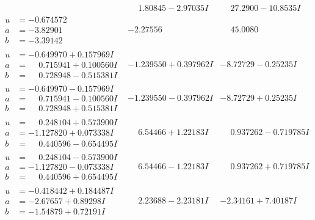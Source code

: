\documentclass[1p]{elsarticle_modified}
\theoremstyle{definition}
\begin{document}
$$\begin{array}{c|c|c}
 & \phantom{-}1.80845 - 2.97035 I & \phantom{-}27.2900 - 10.8535 I \\ \hline\begin{aligned}
u &= -0.674572\phantom{ +0.000000I} \\
a &= -3.82901\phantom{ +0.000000I} \\
b &= -3.39142\phantom{ +0.000000I}\end{aligned}
 & -2.27556\phantom{ +0.000000I} & \phantom{-}45.0080\phantom{ +0.000000I} \\ \hline\begin{aligned}
u &= -0.649970 + 0.157969 I \\
a &= \phantom{-}0.715941 + 0.100560 I \\
b &= \phantom{-}0.728948 - 0.515381 I\end{aligned}
 & -1.239550 + 0.397962 I & -8.72729 - 0.25235 I \\ \hline\begin{aligned}
u &= -0.649970 - 0.157969 I \\
a &= \phantom{-}0.715941 - 0.100560 I \\
b &= \phantom{-}0.728948 + 0.515381 I\end{aligned}
 & -1.239550 - 0.397962 I & -8.72729 + 0.25235 I \\ \hline\begin{aligned}
u &= \phantom{-}0.248104 + 0.573900 I \\
a &= -1.127820 + 0.073338 I \\
b &= \phantom{-}0.440596 - 0.654495 I\end{aligned}
 & \phantom{-}6.54466 + 1.22183 I & \phantom{-}0.937262 - 0.719785 I \\ \hline\begin{aligned}
u &= \phantom{-}0.248104 - 0.573900 I \\
a &= -1.127820 - 0.073338 I \\
b &= \phantom{-}0.440596 + 0.654495 I\end{aligned}
 & \phantom{-}6.54466 - 1.22183 I & \phantom{-}0.937262 + 0.719785 I \\ \hline\begin{aligned}
u &= -0.418442 + 0.184487 I \\
a &= -2.67657 + 0.89298 I \\
b &= -1.54879 + 0.72191 I\end{aligned}
 & \phantom{-}2.23688 - 2.23181 I & -2.34161 + 7.40187 I \\ \hline\begin{aligned}

\end{aligned}
\end{array}$$
\end{document}
